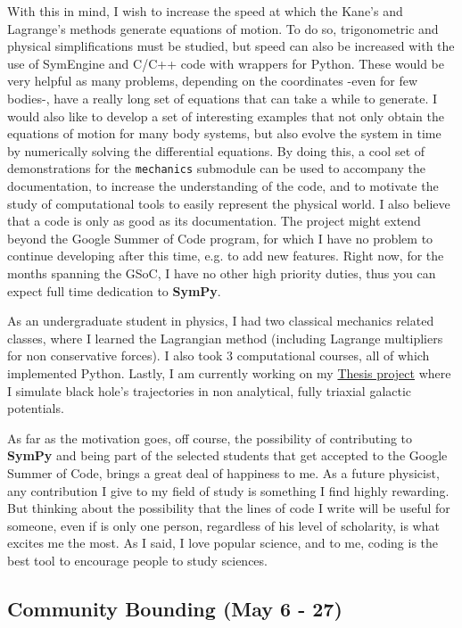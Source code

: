 \documentclass[12pt]{article}
\newcommand{\sympy}{\textbf{SymPy}}
\begin{document}
With this in mind, I wish to increase the speed at which the Kane's and Lagrange's methods generate equations of motion. To do so, trigonometric and physical simplifications must be studied, but speed can also be increased with the use of SymEngine and C/C++ code with wrappers for Python. These would be very helpful as many problems, depending on the coordinates -even for few bodies-, have a really long set of equations that can take a while to generate. I would also like to develop a set of interesting examples that not only obtain the equations of motion for many body systems, but also evolve the system in time by numerically solving the differential equations. By doing this, a cool set of demonstrations for the \texttt{mechanics} submodule can be used to accompany the documentation, to increase the understanding of the code, and to motivate the study of computational tools to easily represent the physical world. I also believe that a code is only as good as its documentation. The project might extend beyond the Google Summer of Code program, for which I have no problem to continue developing after this time, e.g. to add new features. Right now, for the months spanning the GSoC, I have no other high priority duties, thus you can expect full time dedication to \sympy{}.

As an undergraduate student in physics, I had two classical mechanics related classes, where I learned the Lagrangian method (including Lagrange multipliers for non conservative forces). I also took 3 computational courses, all of which implemented Python. Lastly, I am currently working on my \href{https://github.com/jsbarbosa/TesisFisica}{Thesis project} where I simulate black hole's trajectories in non analytical, fully triaxial galactic potentials.

As far as the motivation goes, off course, the possibility of contributing to \sympy{} and being part of the selected students that get accepted to the Google Summer of Code, brings a great deal of happiness to me. As a future physicist, any contribution I give to my field of study is something I find highly rewarding. But thinking about the possibility that the lines of code I write will be useful for someone, even if is only one person, regardless of his level of scholarity, is what excites me the most. As I said, I love popular science, and to me, coding is the best tool to encourage people to study sciences.

\subsection{Community Bounding (May 6 - 27)}
\end{document}
